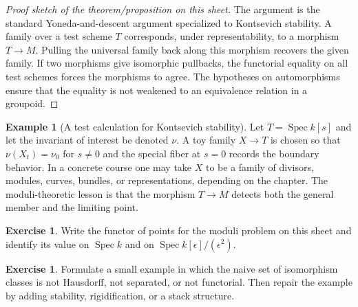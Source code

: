 \documentclass[11pt]{amsart}
\theoremstyle{definition}
\newtheorem{example}[theorem]{Example}
\newtheorem{exercise}[theorem]{Exercise}
\newcommand{\Spec}{\operatorname{Spec}}
\begin{document}
\begin{proof}[Proof sketch of the theorem/proposition on this sheet]
The argument is the standard Yoneda-and-descent argument specialized to Kontsevich stability.  A family over a test scheme $T$ corresponds, under representability, to a morphism $T\to M$.  Pulling the universal family back along this morphism recovers the given family.  If two morphisms give isomorphic pullbacks, the functorial equality on all test schemes forces the morphisms to agree.  The hypotheses on automorphisms ensure that the equality is not weakened to an equivalence relation in a groupoid.
\end{proof}
\begin{example}[A test calculation for Kontsevich stability]
Let $T=\Spec k[s]$ and let the invariant of interest be denoted $\nu$.  A toy family $X\to T$ is chosen so that $\nu(X_t)=\nu_0$ for $s\ne0$ and the special fiber at $s=0$ records the boundary behavior.  In a concrete course one may take $X$ to be a family of divisors, modules, curves, bundles, or representations, depending on the chapter.  The moduli-theoretic lesson is that the morphism $T\to M$ detects both the general member and the limiting point.
\end{example}
\begin{exercise}
Write the functor of points for the moduli problem on this sheet and identify its value on $\Spec k$ and on $\Spec k[\epsilon]/(\epsilon^2)$.
\end{exercise}
\begin{exercise}
Formulate a small example in which the naive set of isomorphism classes is not Hausdorff, not separated, or not functorial.  Then repair the example by adding stability, rigidification, or a stack structure.
\end{exercise}
\clearpage
\end{document}
